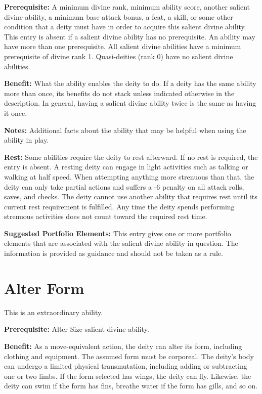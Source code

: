 \documentclass{article}
\begin{document}
\textbf{Prerequisite:} A minimum divine rank, minimum ability score, another salient 
divine ability, a minimum base attack bonus, a feat, a skill, or some other condition 
that a deity must have in order to acquire this salient divine ability. This entry 
is absent if a salient divine ability has no prerequisite. An ability may have 
more than one prerequisite. All salient divine abilities have a minimum prerequisite 
of divine rank 1. Quasi-deities (rank 0) have no salient divine abilities.

\textbf{Benefit:} What the ability enables the deity to do. If a deity has the 
same ability more than once, its benefits do not stack unless indicated otherwise 
in the description. In general, having a salient divine ability twice is the same 
as having it once.

\textbf{Notes:} Additional facts about the ability that may be helpful when using 
the ability in play.

\textbf{Rest: }Some abilities require the deity to rest afterward. If no rest is 
required, the entry is absent. A resting deity can engage in light activities such 
as talking or walking at half speed. When attempting anything more strenuous than 
that, the deity can only take partial actions and suffers a -6 penalty on all attack 
rolls, saves, and checks. The deity cannot use another ability that requires rest 
until its current rest requirement is fulfilled. Any time the deity spends performing 
strenuous activities does not count toward the required rest time. 

\textbf{Suggested Portfolio Elements:} This entry gives one or more portfolio elements 
that are associated with the salient divine ability in question. The information 
is provided as guidance and should not be taken as a rule.

\vspace{24pt}
\section*{Alter Form}

This is an extraordinary ability.

\textbf{Prerequisite:} Alter Size salient divine ability.

\textbf{Benefit:} As a move-equivalent action, the deity can alter its form, including 
clothing and equipment. The assumed form must be corporeal. The deity's body can 
undergo a limited physical transmutation, including adding or subtracting one or 
two limbs. If the form selected has wings, the deity can fly. Likewise, the deity 
can swim if the form has fins, breathe water if the form has gills, and so on.
\end{document}
